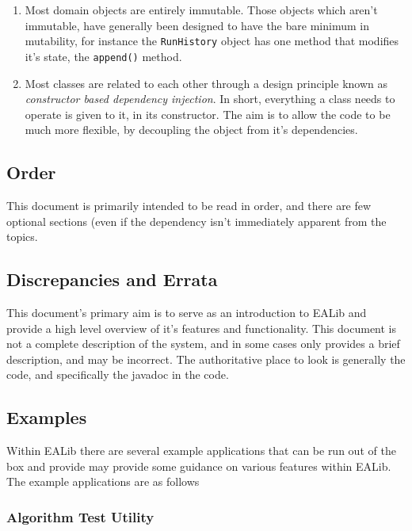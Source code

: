 \documentclass[11pt,letterpaper,oneside]{article}
\begin{document}
\begin{enumerate}

\item Most domain objects are entirely immutable. Those objects which aren't immutable, have generally been designed to have the bare minimum in mutability, for instance the \texttt{RunHistory} object has one method that modifies it's state, the \texttt{append()} method.

\item Most classes are related to each other through a design principle known as \emph{constructor based dependency injection}. In short, everything a class needs to operate is given to it, in its constructor. The aim is to allow the code to be much more flexible, by decoupling the object from it's dependencies. 

\end{enumerate}

\subsection{Order}

This document is primarily intended to be read in order, and there are few optional sections (even if the dependency isn't immediately apparent from the topics.

\subsection{Discrepancies and Errata}

This document's primary aim is to serve as an introduction to EALib and provide a high level overview of it's features and functionality. This document is not a complete description of the system, and in some cases only provides a brief description, and may be incorrect. The authoritative place to look is generally the code, and specifically the javadoc in the code. 

\subsection{Examples}

Within EALib there are several example applications that can be run out of the box and provide may provide some guidance on various features within EALib. The example applications are as follows

\subsubsection{Algorithm Test Utility}
\end{document}
